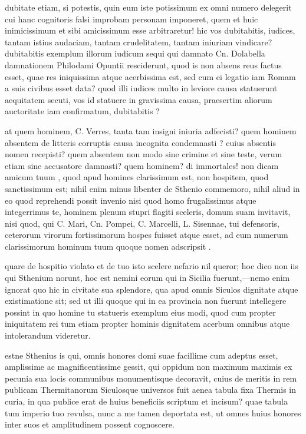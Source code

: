  dubitate etiam, si potestis, quin eum iste potissimum ex omni numero delegerit cui hanc cognitoris falsi improbam personam imponeret, quem et huic inimicissimum et sibi amicissimum esse arbitraretur! hic vos dubitabitis, iudices, tantam istius audaciam, tantam crudelitatem, tantam iniuriam vindicare? dubitabitis exemplum illorum iudicum sequi qui damnato Cn. Dolabella damnationem Philodami Opuntii resciderunt, quod is non absens reus factus esset, quae res iniquissima atque acerbissima est, sed cum ei legatio iam Romam a suis civibus esset data? quod illi iudices multo in leviore causa statuerunt aequitatem secuti, vos id statuere in gravissima causa, praesertim aliorum auctoritate iam confirmatum, dubitabitis ?

 at quem hominem, C. Verres, tanta tam insigni iniuria adfecisti? quem hominem absentem de litteris corruptis causa incognita condemnasti ? cuius absentis nomen recepisti? quem absentem non modo sine crimine et sine teste, verum etiam sine accusatore damnasti? quem hominem? di immortales! non dicam amicum tuum , quod apud homines clarissimum est, non hospitem, quod sanctissimum est; nihil enim minus libenter de Sthenio commemoro, nihil aliud in eo quod reprehendi possit invenio nisi quod homo frugalissimus atque integerrimus te, hominem plenum stupri flagiti sceleris, domum suam invitavit, nisi quod, qui C. Mari, Cn. Pompei, C. Marcelli, L. Sisennae, tui defensoris, ceterorum virorum fortissimorum hospes fuisset atque esset, ad eum numerum clarissimorum hominum tuum quoque nomen adscripsit .

 quare de hospitio violato et de tuo isto scelere nefario nil queror; hoc dico non iis qui Sthenium norunt, hoc est nemini eorum qui in Sicilia fuerunt,—nemo enim ignorat quo hic in civitate sua splendore, qua apud omnis Siculos dignitate atque existimatione sit; sed ut illi quoque qui in ea provincia non fuerunt intellegere possint in quo homine tu statueris exemplum eius modi, quod cum propter iniquitatem rei tum etiam propter hominis dignitatem acerbum omnibus atque intolerandum videretur.

 estne Sthenius is qui, omnis honores domi suae facillime cum adeptus esset, amplissime ac magnificentissime gessit, qui oppidum non maximum maximis ex pecunia sua locis communibus monumentisque decoravit, cuius de meritis in rem publicam Thermitanorum Siculosque universos fuit aenea tabula fixa Thermis in curia, in qua publice erat de huius beneficiis scriptum et incisum? quae tabula tum imperio tuo revulsa, nunc a me tamen deportata est, ut omnes huius honores inter suos et amplitudinem possent cognoscere.

